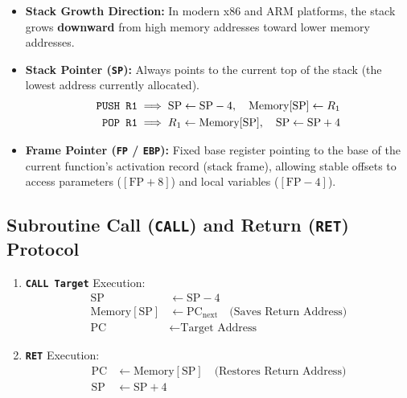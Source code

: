 \begin{itemize}
    \item \textbf{Stack Growth Direction:} In modern x86 and ARM platforms, the stack grows \textbf{downward} from high memory addresses toward lower memory addresses.
    \item \textbf{Stack Pointer (\texttt{SP}):} Always points to the current top of the stack (the lowest address currently allocated).
    \begin{align*}
    \text{\texttt{PUSH R1}} &\implies \text{SP} \leftarrow \text{SP} - 4, \quad \text{Memory}[\text{SP}] \leftarrow R_1 \\
    \text{\texttt{POP R1}}  &\implies R_1 \leftarrow \text{Memory}[\text{SP}], \quad \text{SP} \leftarrow \text{SP} + 4
    \end{align*}
    \item \textbf{Frame Pointer (\texttt{FP} / \texttt{EBP}):} Fixed base register pointing to the base of the current function's activation record (stack frame), allowing stable offsets to access parameters ($[\text{FP} + 8]$) and local variables ($[\text{FP} - 4]$).
\end{itemize}

\subsection{Subroutine Call (\texttt{CALL}) and Return (\texttt{RET}) Protocol}
\begin{enumerate}[label=\bfseries\arabic*.]
    \item \textbf{\texttt{CALL Target}} Execution:
    \begin{align*}
    \text{SP} &\leftarrow \text{SP} - 4 \\
    \text{Memory}[\text{SP}] &\leftarrow \text{PC}_{\text{next}} \quad \text{(Saves Return Address)} \\
    \text{PC} &\leftarrow \text{Target Address}
    \end{align*}
    \item \textbf{\texttt{RET}} Execution:
    \begin{align*}
    \text{PC} &\leftarrow \text{Memory}[\text{SP}] \quad \text{(Restores Return Address)} \\
    \text{SP} &\leftarrow \text{SP} + 4
    \end{align*}
\end{enumerate}

